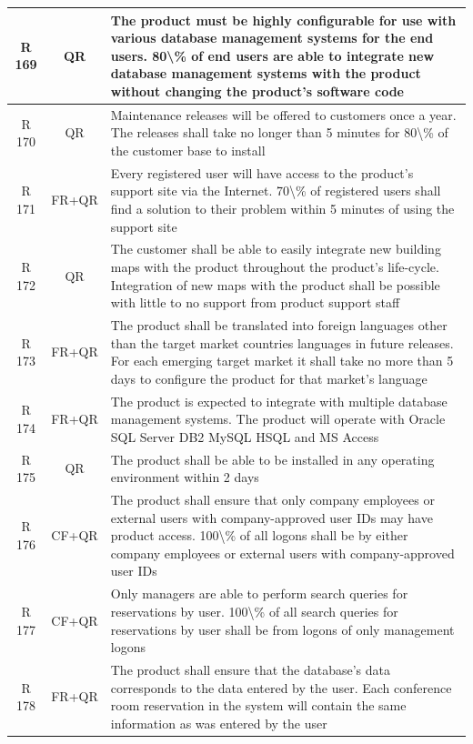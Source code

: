 \documentclass[dissertation,final]{softeng}
\begin{document}
\begin{appendices}
{\begin{center}
\begin{longtable}{c c m{}}
    R 169   & QR & The product must be highly configurable for use with various database management systems for the end users. 80\textbackslash{}\% of end users are able to integrate new database management systems with the product without changing the product's software code \\    \midrule
    R 170   & QR & Maintenance releases will be offered to customers once a year. The releases shall take no longer than 5 minutes for 80\textbackslash{}\% of the customer base to install \\    \midrule
    R 171   & FR+QR & Every registered user will have access to the product's support site via the Internet. 70\textbackslash{}\% of registered users shall find a solution to their problem within 5 minutes of using the support site \\    \midrule
    R 172   & QR & The customer shall be able to easily integrate new building maps with the product throughout the product's life-cycle. Integration of new maps with the product shall be possible with little to no support from product support staff \\    \midrule
    R 173   & FR+QR & The product shall be translated into foreign languages other than the target market countries languages in future releases. For each emerging target market it shall take no more than 5 days to configure the product for that market's language \\    \midrule
    R 174   & FR+QR & The product is expected to integrate with multiple database management systems. The product will operate with Oracle SQL Server DB2 MySQL HSQL and MS Access \\    \midrule
    R 175   & QR & The product shall be able to be installed in any operating environment within 2 days \\    \midrule
    R 176   & CF+QR & The product shall ensure that only company employees or external users with company-approved user IDs may have product access. 100\textbackslash{}\% of all logons shall be by either company employees or external users with company-approved user IDs \\    \midrule
    R 177   & CF+QR & Only managers are able to perform search queries for reservations by user. 100\textbackslash{}\% of all search queries for reservations by user shall be from logons of only management logons \\    \midrule
    R 178   & FR+QR & The product shall ensure that the database's data corresponds to the data entered by the user. Each conference room reservation in the system will contain the same information as was entered by the user \\*    \midrule

\end{longtable}
\end{center}}
\end{appendices}
\end{document}
